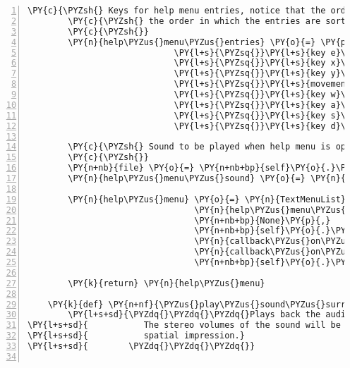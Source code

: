 \begin{Verbatim}[commandchars=\\\{\},numbers=left,firstnumber=1,stepnumber=1]
        \PY{c}{\PYZsh{} Keys for help menu entries, notice that the order of this list defines}
        \PY{c}{\PYZsh{} the order in which the entries are sorted in the list}
        \PY{c}{\PYZsh{}}
        \PY{n}{help\PYZus{}menu\PYZus{}entries} \PY{o}{=} \PY{p}{[}\PY{l+s}{\PYZsq{}}\PY{l+s}{key q}\PY{l+s}{\PYZsq{}}\PY{p}{,}
                             \PY{l+s}{\PYZsq{}}\PY{l+s}{key e}\PY{l+s}{\PYZsq{}}\PY{p}{,}
                             \PY{l+s}{\PYZsq{}}\PY{l+s}{key x}\PY{l+s}{\PYZsq{}}\PY{p}{,}
                             \PY{l+s}{\PYZsq{}}\PY{l+s}{key y}\PY{l+s}{\PYZsq{}}\PY{p}{,}
                             \PY{l+s}{\PYZsq{}}\PY{l+s}{movement}\PY{l+s}{\PYZsq{}}\PY{p}{,}
                             \PY{l+s}{\PYZsq{}}\PY{l+s}{key w}\PY{l+s}{\PYZsq{}}\PY{p}{,}
                             \PY{l+s}{\PYZsq{}}\PY{l+s}{key a}\PY{l+s}{\PYZsq{}}\PY{p}{,}
                             \PY{l+s}{\PYZsq{}}\PY{l+s}{key s}\PY{l+s}{\PYZsq{}}\PY{p}{,}
                             \PY{l+s}{\PYZsq{}}\PY{l+s}{key d}\PY{l+s}{\PYZsq{}}\PY{p}{]}

        \PY{c}{\PYZsh{} Sound to be played when help menu is opened}
        \PY{c}{\PYZsh{}}
        \PY{n+nb}{file} \PY{o}{=} \PY{n+nb+bp}{self}\PY{o}{.}\PY{n}{assets}\PY{o}{.}\PY{n}{fetch}\PY{p}{(}\PY{l+s}{\PYZsq{}}\PY{l+s}{help\PYZus{}menu.ogg}\PY{l+s}{\PYZsq{}}\PY{p}{)}
        \PY{n}{help\PYZus{}menu\PYZus{}sound} \PY{o}{=} \PY{n}{pygame}\PY{o}{.}\PY{n}{mixer}\PY{o}{.}\PY{n}{Sound}\PY{p}{(}\PY{n+nb}{file}\PY{p}{)}

        \PY{n}{help\PYZus{}menu} \PY{o}{=} \PY{n}{TextMenuList}\PY{p}{(}\PY{n}{help\PYZus{}menu\PYZus{}entries}\PY{p}{,}
                                 \PY{n}{help\PYZus{}menu\PYZus{}sound}\PY{p}{,}
                                 \PY{n+nb+bp}{None}\PY{p}{,}
                                 \PY{n+nb+bp}{self}\PY{o}{.}\PY{n}{channel\PYZus{}system}\PY{p}{,}
                                 \PY{n}{callback\PYZus{}on\PYZus{}help\PYZus{}entry\PYZus{}selected}\PY{p}{,}
                                 \PY{n}{callback\PYZus{}on\PYZus{}help\PYZus{}menu\PYZus{}exit}\PY{p}{,}
                                 \PY{n+nb+bp}{self}\PY{o}{.}\PY{n}{tts\PYZus{}engine}\PY{p}{)}

        \PY{k}{return} \PY{n}{help\PYZus{}menu}

    \PY{k}{def} \PY{n+nf}{\PYZus{}play\PYZus{}sound\PYZus{}surrounding\PYZus{}entity}\PY{p}{(}\PY{n+nb+bp}{self}\PY{p}{,} \PY{n}{entity}\PY{p}{)}\PY{p}{:}
        \PY{l+s+sd}{\PYZdq{}\PYZdq{}\PYZdq{}Plays back the audio assets of the given entity if it is on a position close enough to the client.}
\PY{l+s+sd}{           The stereo volumes of the sound will be adjusted to simulate a}
\PY{l+s+sd}{           spatial impression.}
\PY{l+s+sd}{        \PYZdq{}\PYZdq{}\PYZdq{}}


\end{Verbatim}
